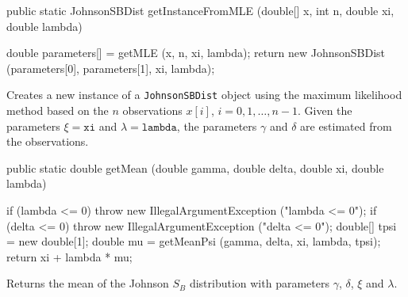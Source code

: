 \begin{code}

   public static JohnsonSBDist getInstanceFromMLE (double[] x, int n,
                                                   double xi, double lambda)\begin{hide} {
      double parameters[] = getMLE (x, n, xi, lambda);
      return new JohnsonSBDist (parameters[0], parameters[1], xi, lambda);
   }\end{hide}
\end{code}
\begin{tabb}
   Creates a new instance of a \texttt{JohnsonSBDist} object
   using the maximum likelihood method based
   on the $n$ observations $x[i]$, $i = 0, 1, \ldots, n-1$.
   Given the parameters $\xi = \texttt{xi}$ and $\lambda = \texttt{lambda}$,
   the parameters $\gamma$ and $\delta$ are estimated from the observations.
\end{tabb}
\begin{htmlonly}
\end{htmlonly}
\begin{code}

   public static double getMean (double gamma, double delta,
                                 double xi, double lambda)\begin{hide} {
      if (lambda <= 0)
         throw new IllegalArgumentException ("lambda <= 0");
      if (delta <= 0)
         throw new IllegalArgumentException ("delta <= 0");
      double[] tpsi = new double[1];
      double mu = getMeanPsi (gamma, delta, xi, lambda, tpsi);
      return xi + lambda * mu;
   }\end{hide}
\end{code}
  \begin{tabb}
  Returns the mean 
   of the Johnson $S_B$ distribution with parameters
   $\gamma$, $\delta$, $\xi$ and $\lambda$.
 \end{tabb}
